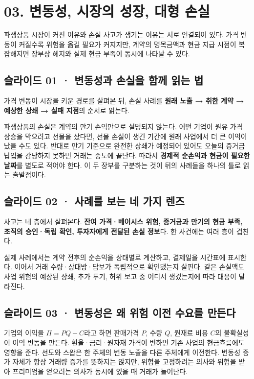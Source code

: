 \documentclass[11pt,a4paper]{article}
\begin{document}
\section{03. 변동성, 시장의 성장, 대형 손실}
파생상품 시장이 커진 이유와 손실 사고가 생기는 이유는 서로 연결되어 있다. 가격 변동이 커질수록 위험을 옮길 필요가 커지지만, 계약의 명목금액과 현금 지급 시점이 복잡해지면 장부상 헤지와 실제 현금 부족이 동시에 나타날 수 있다.\par

\subsection{슬라이드 01 · 변동성과 손실을 함께 읽는 법}
가격 변동이 시장을 키운 경로를 살펴본 뒤, 손실 사례를 \textbf{원래 노출 → 취한 계약 → 예상한 상쇄 → 실패 지점}의 순서로 읽는다.\par

파생상품의 손실은 계약의 만기 손익만으로 설명되지 않는다. 어떤 기업이 원유 가격 상승을 막으려고 선물을 샀다면, 선물 손실이 생긴 기간에 원래 사업에서 더 큰 이익이 났을 수도 있다. 반대로 만기 기준으로 완전한 상쇄가 예정되어 있어도 오늘의 증거금 납입을 감당하지 못하면 거래는 중도에 끝난다. 따라서 \textbf{경제적 순손익과 현금이 필요한 날짜}를 별도로 적어야 한다. 이 두 장부를 구분하는 것이 뒤의 사례들을 하나의 틀로 읽는 출발점이다.\par

\subsection{슬라이드 02 · 사례를 보는 네 가지 렌즈}
사고는 네 층에서 살펴본다. \textbf{잔여 가격·베이시스 위험, 증거금과 만기의 현금 부족, 조직의 승인·독립 확인, 투자자에게 전달된 손실 정보}다. 한 사건에는 여러 층이 겹친다.\par

실제 사례에서는 계약 전후의 순손익을 상태별로 계산하고, 결제일을 시간표에 표시한다. 이어서 거래 수량·상대방·담보가 독립적으로 확인됐는지 살핀다. 같은 손실액도 사업 위험의 예상된 상쇄, 추가 투기, 허위 보고 중 어디서 생겼는지에 따라 대응이 달라진다.\par

\subsection{슬라이드 03 · 변동성은 왜 위험 이전 수요를 만든다}
기업의 이익을 $\Pi=P Q-C$라고 하면 판매가격 $P$, 수량 $Q$, 원재료 비용 $C$의 불확실성이 이익 변동을 만든다. 환율·금리·원자재 가격이 변하면 기존 사업의 현금흐름에도 영향을 준다. 선도와 스왑은 한 주체의 변동 노출을 다른 주체에게 이전한다. 변동성 증가 자체가 항상 거래량 증가를 뜻하지는 않지만, 위험을 고정하려는 의사와 위험을 받아 프리미엄을 얻으려는 의사가 동시에 있을 때 거래가 늘어난다.\par
\end{document}
